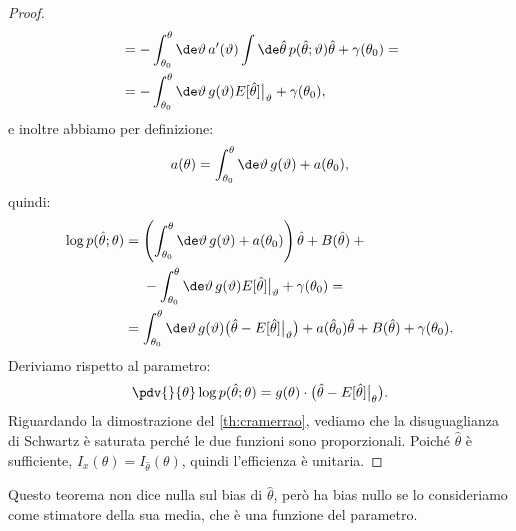 \begin{proof}
\begin{align*}
		&= - \int_{\theta_0}^\theta \de\vartheta\, a'(\vartheta)
		\int\de\hat\theta\, p(\hat\theta;\vartheta) \hat\theta
		+ \gamma(\theta_0) = \\
		&= - \int_{\theta_0}^\theta \de\vartheta\, g(\vartheta) E[\hat\theta]\big|_{\vartheta}
		+ \gamma(\theta_0),
	\end{align*}
	e inoltre abbiamo per definizione:
	\begin{equation*}
		a(\theta)
		= \int_{\theta_0}^\theta \de\vartheta\, g(\vartheta) + a(\theta_0),
	\end{equation*}
	quindi:
	\begin{align*}
		\log p(\hat\theta;\theta)
		&= \left( \int_{\theta_0}^\theta \de\vartheta\, g(\vartheta) + a(\theta_0) \right) \hat\theta
		+ B(\hat\theta) + {}\\
		&\phantom{{}={}}- \int_{\theta_0}^\theta \de\vartheta\, g(\vartheta) E[\hat\theta]\big|_{\vartheta} + \gamma(\theta_0) = \\
		&= \int_{\theta_0}^\theta \de\vartheta\, g(\vartheta) \big(\hat\theta-E[\hat\theta]\big|_{\vartheta}\big)
		+ a(\hat\theta_0)\hat\theta + B(\hat\theta) + \gamma(\theta_0).
	\end{align*}
	Deriviamo rispetto al parametro:
	\begin{equation*}
		\pdv{}{\theta} \log p(\hat\theta;\theta)
		= g(\theta) \cdot \big(\hat\theta-E[\hat\theta]\big|_{\theta}\big).
	\end{equation*}
	Riguardando la dimostrazione del \autoref{th:cramerrao},
	vediamo che la disuguaglianza di Schwartz è saturata perché le due funzioni sono proporzionali.
	Poiché $\hat\theta$ è sufficiente, $I_x(\theta)=I_{\hat\theta}(\theta)$,
	quindi l'efficienza è unitaria.
\end{proof}

Questo teorema non dice nulla sul bias di $\hat\theta$,
però ha bias nullo se lo consideriamo come stimatore della sua media,
che è una funzione del parametro.
